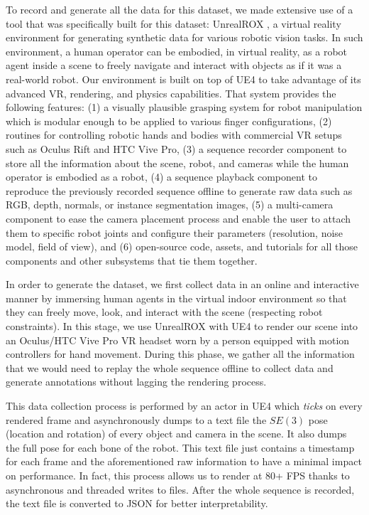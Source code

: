 To record and generate all the data for this dataset, we made extensive use of a tool that was specifically built for this dataset: UnrealROX \cite{Martinez-Gonzalez2018}, a virtual reality environment for generating synthetic data for various robotic vision tasks. In such environment, a human operator can be embodied, in virtual reality, as a robot agent inside a scene to freely navigate and interact with objects as if it was a real-world robot. Our environment is built on top of \ac{UE4} to take advantage of its advanced \ac{VR}, rendering, and physics capabilities. That system provides the following features: (1) a visually plausible grasping system for robot manipulation which is modular enough to be applied to various finger configurations, (2) routines for controlling robotic hands and bodies with commercial \ac{VR} setups such as Oculus  Rift and HTC Vive Pro, (3) a sequence recorder component to store all the information about the scene, robot, and cameras while the human operator is embodied as a robot, (4) a sequence playback component to reproduce the previously recorded sequence offline to generate raw data such as RGB, depth, normals,  or  instance  segmentation  images,  (5)  a  multi-camera  component  to  ease  the  camera  placement  process and  enable  the  user  to  attach  them  to  specific  robot  joints and  configure  their  parameters  (resolution,  noise  model, field of view), and (6) open-source code, assets, and tutorials for all those components and other subsystems that tie them together.

In order to generate the dataset, we first collect data in an online and interactive manner by immersing human agents in the virtual indoor environment so that they can freely move, look, and interact with the scene (respecting robot constraints). In this stage, we use UnrealROX with \ac{UE4} to render our scene into an Oculus/HTC Vive Pro \ac{VR} headset worn by a person equipped with motion controllers for hand movement. During this phase, we gather all the information that we would need to replay the whole sequence offline to collect data and generate annotations without lagging the rendering process.

This data collection process is performed by an actor in \ac{UE4} which \emph{ticks} on every rendered frame and asynchronously dumps to a text file the $SE(3)$ pose (location and rotation) of every object and camera in the scene. It also dumps the full pose for each bone of the robot. This text file just contains a timestamp for each frame and the aforementioned raw information to have a minimal impact on performance. In fact, this process allows us to render at 80+ \ac{FPS} thanks to asynchronous and threaded writes to files. After the whole sequence is recorded, the text file is converted to JSON for better interpretability.


